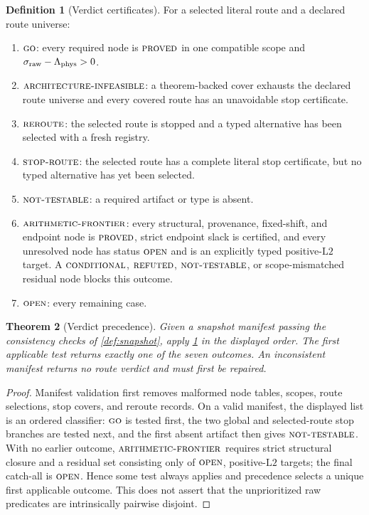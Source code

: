 \documentclass[11pt]{article}
\newtheorem{theorem}{Theorem}[section]
\theoremstyle{definition}
\newtheorem{definition}[theorem]{Definition}
\theoremstyle{remark}
\newcommand{\GO}{\textnormal{\textsc{go}}}
\newcommand{\AINF}{\textnormal{\textsc{architecture-infeasible}}}
\newcommand{\REROUTE}{\textnormal{\textsc{reroute}}}
\newcommand{\STOPR}{\textnormal{\textsc{stop-route}}}
\newcommand{\NT}{\textnormal{\textsc{not-testable}}}
\newcommand{\AF}{\textnormal{\textsc{arithmetic-frontier}}}
\newcommand{\OPEN}{\textnormal{\textsc{open}}}
\newcommand{\PROVED}{\textnormal{\textsc{proved}}}
\newcommand{\COND}{\textnormal{\textsc{conditional}}}
\newcommand{\REFUTED}{\textnormal{\textsc{refuted}}}
\newcommand{\Ltwo}{\mathrm{L2}}
\begin{document}
\begin{definition}[Verdict certificates]
\label{def:verdicts}
For a selected literal route and a declared route universe:
\begin{enumerate}[label=(\roman*),leftmargin=2.2em]
\item \(\GO\): every required node is \(\PROVED\) in one compatible
  scope and
  \(\sigma_{\rm raw}-\Lambda_{\rm phys}>0\).
\item \(\AINF\): a theorem-backed cover exhausts the declared route
  universe and every covered route has an unavoidable stop
  certificate.
\item \(\REROUTE\): the selected route is stopped and a typed
  alternative has been selected with a fresh registry.
\item \(\STOPR\): the selected route has a complete literal stop
  certificate, but no typed alternative has yet been selected.
\item \(\NT\): a required artifact or type is absent.
\item \(\AF\): every structural, provenance, fixed-shift, and endpoint
  node is \(\PROVED\), strict endpoint slack is certified, and every
  unresolved node has status \(\OPEN\) and is an explicitly typed
  positive-\(\Ltwo\) target.  A \(\COND\), \(\REFUTED\), \(\NT\), or
  scope-mismatched residual node blocks this outcome.
\item \(\OPEN\): every remaining case.
\end{enumerate}
\end{definition}

\begin{theorem}[Verdict precedence]
\label{thm:precedence}
Given a snapshot manifest passing the consistency checks of
\cref{def:snapshot}, apply \cref{def:verdicts} in the displayed order.
The first applicable test returns exactly one of the seven outcomes.
An inconsistent manifest returns no route verdict and must first be
repaired.
\end{theorem}

\begin{proof}
Manifest validation first removes malformed node tables, scopes,
route selections, stop covers, and reroute records.  On a valid
manifest, the displayed list is an ordered classifier: \(\GO\) is
tested first, the two global and selected-route stop branches are
tested next, and the first absent artifact then gives \(\NT\).  With
no earlier outcome, \(\AF\) requires strict structural closure and a
residual set consisting only of \(\OPEN\), positive-\(\Ltwo\) targets;
the final catch-all is \(\OPEN\).  Hence some test always applies and
precedence selects a unique first applicable outcome.  This does not
assert that the unprioritized raw predicates are intrinsically
pairwise disjoint.
\end{proof}
\end{document}
